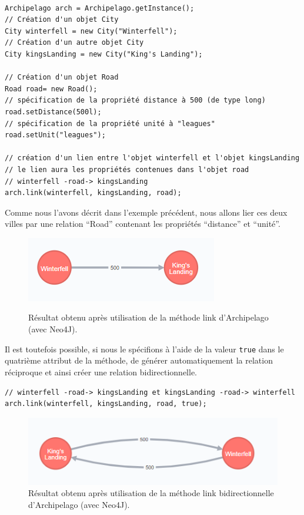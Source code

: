 \documentclass[a4paper,fleqn,12pt,oneside]{report}
\begin{document}
\begin{lstlisting}

Archipelago arch = Archipelago.getInstance();
// Création d'un objet City
City winterfell = new City("Winterfell");
// Création d'un autre objet City
City kingsLanding = new City("King's Landing");

// Création d'un objet Road
Road road= new Road();
// spécification de la propriété distance à 500 (de type long)
road.setDistance(500l);
// spécification de la propriété unité à "leagues"
road.setUnit("leagues");
        
// création d'un lien entre l'objet winterfell et l'objet kingsLanding
// le lien aura les propriétés contenues dans l'objet road
// winterfell -road-> kingsLanding
arch.link(winterfell, kingsLanding, road);

\end{lstlisting}

Comme nous l'avons décrit dans l'exemple précédent, nous allons lier ces deux villes par une relation \enquote{Road} contenant les propriétés \enquote{distance} et \enquote{unité}.

\begin{figure}[!ht]
\centering
\includegraphics[scale=1.2]{figures/Rel.png}
\label{fig:Relation}
\caption{Résultat obtenu après utilisation de la méthode link d'Archipelago (avec Neo4J).}
\end{figure}

Il est toutefois possible, si nous le spécifions à l'aide de la valeur \texttt{true} dans le quatrième attribut de la méthode, de générer automatiquement la relation réciproque et ainsi créer une relation bidirectionnelle. 

\begin{lstlisting}
// winterfell -road-> kingsLanding et kingsLanding -road-> winterfell
arch.link(winterfell, kingsLanding, road, true);
\end{lstlisting}


\begin{figure}[!ht]
\centering
\includegraphics[scale=1.2]{figures/RelBidir.png}
\caption{Résultat obtenu après utilisation de la méthode link bidirectionnelle d'Archipelago (avec Neo4J).}
\label{fig:RelationBiDir}
\end{figure}
\newpage
\end{document}
